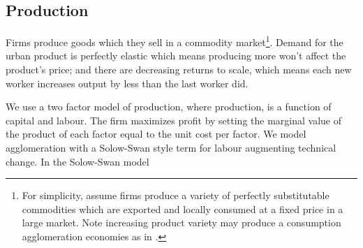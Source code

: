 




\subsection{Production}

Firms produce goods which they sell in a commodity market\footnote{For simplicity, assume firms produce a variety of perfectly substitutable commodities which are exported and locally consumed at a fixed price in a large market. Note increasing product variety may produce a consumption agglomeration economies as in \cite{fujitaSpatialEconomyCities1999}.}. Demand for the urban product is perfectly elastic which means producing more won't affect the product's price; and there are decreasing returns to scale, which means each new worker increases output by less than the last worker did. 
  
We use a two factor model of production, where production, is a function of capital and labour. The firm maximizes profit by setting the marginal value of the product of each factor equal to the unit cost per factor. We model agglomeration with a Solow-Swan style term for labour augmenting technical change. In the Solow-Swan model 

